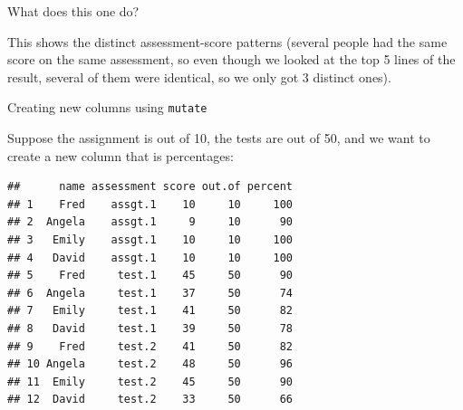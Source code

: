 \begin{frame}[fragile]{What does this one do?}
  
\begin{knitrout}
\color{fgcolor}
\end{knitrout}
  
This shows the distinct assessment-score patterns (several people had
the same score on the same assessment, so even though we looked at the
top 5 lines of the result, several of them were identical, so we only
got 3 distinct ones).
  
\end{frame}


\begin{frame}[fragile]{Creating new columns using \texttt{mutate}}
  
  Suppose the assignment is out of 10, the tests are out of 50, and we
  want to create a new column that is percentages:
  
  {\small
\begin{knitrout}
\color{fgcolor}\begin{kframe}
\begin{alltt}
\hlstd{=}\hlstd{(}\hlstd{(}\hlstd{,}\hlstd{),}\hlstd{(}\hlstd{,}\hlstd{)),}
               \hlopt{/}\hlopt{*}\hlstd{)}
\end{alltt}
\begin{verbatim}
##      name assessment score out.of percent
## 1    Fred    assgt.1    10     10     100
## 2  Angela    assgt.1     9     10      90
## 3   Emily    assgt.1    10     10     100
## 4   David    assgt.1    10     10     100
## 5    Fred     test.1    45     50      90
## 6  Angela     test.1    37     50      74
## 7   Emily     test.1    41     50      82
## 8   David     test.1    39     50      78
## 9    Fred     test.2    41     50      82
## 10 Angela     test.2    48     50      96
## 11  Emily     test.2    45     50      90
## 12  David     test.2    33     50      66
\end{verbatim}
\end{kframe}
\end{knitrout}
}
  
\end{frame}

